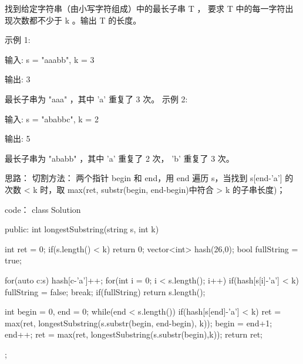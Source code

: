 找到给定字符串（由小写字符组成）中的最长子串 T ， 要求 T 中的每一字符出现次数都不少于 k 。输出 T 的长度。

示例 1:

输入:
s = "aaabb", k = 3

输出:
3

最长子串为 "aaa" ，其中 'a' 重复了 3 次。
示例 2:

输入:
s = "ababbc", k = 2

输出:
5

最长子串为 "ababb" ，其中 'a' 重复了 2 次， 'b' 重复了 3 次。

































思路：
切割方法：
两个指针 begin 和 end，用 end 遍历 s，当找到 s[end-'a'] 的次数 < k 时，取 max(ret, substr(begin, end-begin)中符合 > k 的子串长度)； 


























code：
class Solution {
public:
    int longestSubstring(string s, int k) {
        int ret = 0;
        if(s.length() < k) return 0;
        vector<int> hash(26,0);
        bool fullString = true;
        
        for(auto c:s) hash[c-'a']++;
        for(int i = 0; i < s.length(); i++)
            if(hash[s[i]-'a'] < k)
            {
                fullString = false; break;
            }
        if(fullString) return s.length();
        
        int begin = 0, end = 0;
        while(end < s.length())
        {
            if(hash[s[end]-'a'] < k)
            {
                ret = max(ret, longestSubstring(s.substr(begin, end-begin), k));
                begin = end+1;
            }
            end++;
        }
        ret = max(ret, longestSubstring(s.substr(begin),k));
        return ret;
    }
};